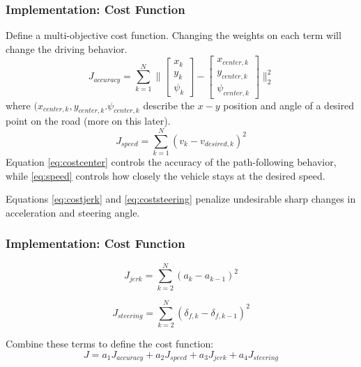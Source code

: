 \documentclass{beamer}
\begin{document}
\begin{frame}
\frametitle{Implementation: Cost Function}
Define a multi-objective cost function. Changing the weights on each term will change the driving behavior.
\begin{equation}
J_{accuracy} = \sum_{k=1}^N\Big\| \begin{bmatrix}
x_k\\y_k\\\psi_k
\end{bmatrix} - \begin{bmatrix}
x_{center,k}\\y_{center,k}\\\psi_{center,k}
\end{bmatrix} \Big\|_2^2
\label{eq:costcenter}
\end{equation}
where $(x_{center,k}, y_{center,k}. \psi_{center,k}$ describe the $x-y$ position and angle of a desired point on the road (more on this later).
\begin{equation}
J_{speed} = \sum_{k=1}^N (v_k - v_{desired,k})^2
\label{eq:speed}
\end{equation}
Equation \eqref{eq:costcenter} controls the accuracy of the path-following behavior, while \eqref{eq:speed} controls how closely the vehicle stays at the desired speed.
\end{frame}

\begin{frame}
Equations \eqref{eq:costjerk} and \eqref{eq:coststeering} penalize undesirable sharp changes in acceleration and steering angle.
\frametitle{Implementation: Cost Function}
\begin{equation}
J_{jerk} = \sum_{k=2}^N (a_k - a_{k-1})^2
\label{eq:costjerk}
\end{equation}

\begin{equation}
J_{steering} = \sum_{k=2}^N (\delta_{f,k} - \delta_{f,k-1})^2
\label{eq:coststeering}
\end{equation}

Combine these terms to define the cost function:
\begin{equation}
J = a_1 J_{accuracy} + a_2 J_{speed} + a_3 J_{jerk} + a_4 J_{steering}
\label{eq:costfinal}
\end{equation}
\end{frame}
\end{document}
